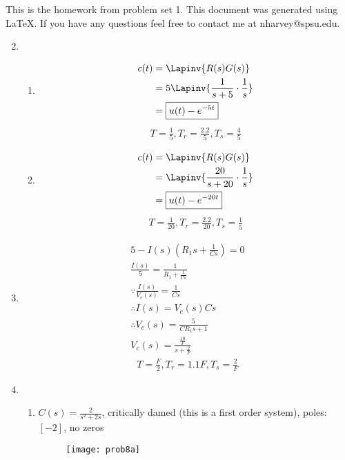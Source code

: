 \documentclass[main.tex]{subfiles}
\begin{document}
This is the homework from problem set 1. This document was generated using
\LaTeX. If you have any questions feel free to contact me at nharvey@spsu.edu.

\begin{enumerate}

		\setcounter{enumi}{1}
	\item
		\begin{enumerate}
			\item 
				\begin{align*}
					c(t) &= \Lapinv{R(s)G(s)}
					\\   &= 5\Lapinv{\frac{1}{s+5}\cdot\frac{1}{s}}
					\\   &= \boxed{u(t) - e^{-5t}}
				\end{align*}
				\begin{align*}
					T = \frac{1}{5}, T_r = \frac{2.2}{5}, T_s = \frac{4}{5}
				\end{align*}

			\item 
				\begin{align*}
					c(t) &= \Lapinv{R(s)G(s)}
					\\   &= \Lapinv{\frac{20}{s+20} \cdot \frac{1}{s}}
					\\   &= \boxed{u(t) - e^{-20t}}
				\end{align*}
				\begin{align*}
					T = \frac{1}{20}, T_r = \frac{2.2}{20}, T_s = \frac{1}{5}
				\end{align*}
		\end{enumerate}

		\setcounter{enumi}{3}
	\item
		\begin{align*}
			5 - I(s)(R_1s+\frac{1}{Cs}) = 0
			\\\frac{I(s)}{5} = \frac{1}{R_1+\frac{1}{Cs}}
			\\\because \frac{I(s)}{V_c(s)} = \frac{1}{Cs}
			\\\therefore I(s) = V_c(s)Cs
			\\\therefore V_c(s) = \frac{5}{CR_1s+1}
			\\ \boxed{V_c(s) = \frac{\frac{10}{F}}{s+\frac{2}{F}}}
		\end{align*}
		\begin{align*}
			T = \frac{F}{2}, T_r = 1.1F, T_s = \frac{2}{F}
		\end{align*}

		\setcounter{enumi}{7}
	\item
		\begin{enumerate}
			\item
				$C(s) = \frac{2}{s^2+2s}$, critically damed (this is a first order
				system), poles: $[-2]$, no zeros
				\\\begin{figure}[H]
					\texttt{[image: prob8a]}
				\end{figure}


\end{enumerate}
\end{enumerate}
\end{document}
